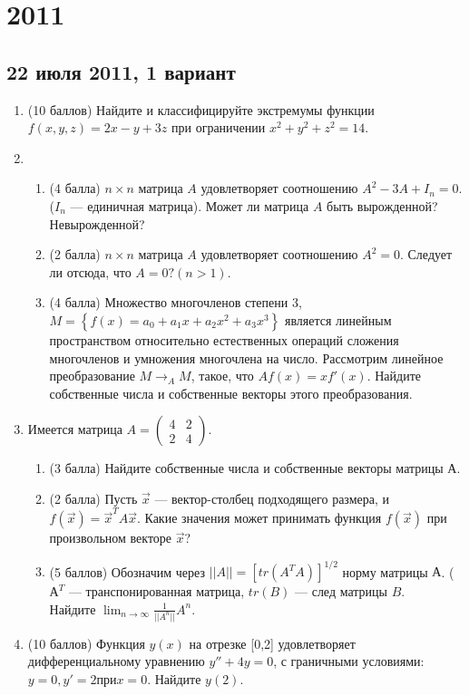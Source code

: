 \documentclass[pdftex,12pt,a4paper]{article}
\begin{document}
\section{2011}

\subsection{22 июля 2011, 1 вариант}
\begin{enumerate}
\item (10 баллов) Найдите и классифицируйте экстремумы функции $f(x,y,z)=2x-y+3z$ при ограничении $x^2+y^2+z^2=14$.\\
\item \begin{enumerate}
\item (4 балла) $n\times n$ матрица $A$ удовлетворяет соотношению $A^2-3A+I_n=0$. ($I_n$ --- единичная матрица). Может ли матрица $A$ быть вырожденной? Невырожденной?
\item (2 балла) $n\times n$ матрица $A$ удовлетворяет соотношению $A^2=0$. Следует ли отсюда, что $A=0? (n>1)$.
\item (4 балла) Множество многочленов степени 3, $M=\left\{f(x)=a_0+a_1x+a_2x^2+a_3x^3\right\}$ является линейным пространством относительно естественных операций сложения многочленов и умножения многочлена на число. Рассмотрим линейное преобразование $M\longrightarrow_A M$, такое, что $Af(x)=xf'(x)$. Найдите собственные числа и собственные векторы этого преобразования.
\end{enumerate}
\item Имеется матрица $A=\left(\begin{array}{cc}
4 & 2\\
2 & 4
\end{array}\right)$.
\begin{enumerate}
\item (3 балла) Найдите собственные числа и собственные векторы матрицы А.
\item (2 балла) Пусть $\vec{x}$ --- вектор-столбец подходящего размера, и $f(\vec{x})=\vec{x}^T A \vec{x}$. Какие значения может принимать функция $f(\vec{x})$ при произвольном векторе $\vec{x}$?
\item  (5 баллов) Обозначим через $||A||=[tr(A^TA)]^{1/2}$ норму матрицы $А$. ($А^T$ --- транспонированная матрица, $tr(B)$ --- след матрицы $B$.\\
Найдите $\lim_{n\to \infty}\frac{1}{||A^n||} A^n$.
\end{enumerate}
\item (10 баллов) Функция $y(x)$ на отрезке [0,2] удовлетворяет дифференциальному уравнению $y''+4y=0$, с граничными условиями: $y=0, y'=2 при x=0$. Найдите $y(2)$.\\

\end{enumerate}
\end{document}
